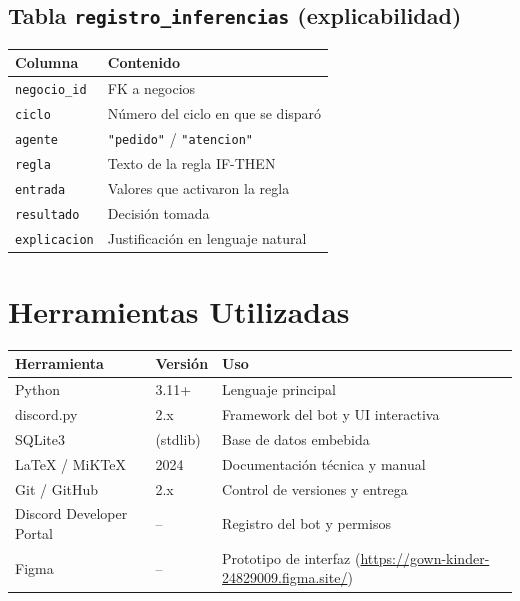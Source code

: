 \documentclass[12pt,spanish]{article}
\begin{document}
\subsection*{Tabla \texttt{registro\_inferencias} (explicabilidad)}

\begin{center}
\begin{tabular}{ll}
  \toprule
  Columna & Contenido \\
  \midrule
  \texttt{negocio\_id} & FK a negocios \\
  \texttt{ciclo} & Número del ciclo en que se disparó \\
  \texttt{agente} & \texttt{"pedido"} / \texttt{"atencion"} \\
  \texttt{regla} & Texto de la regla IF-THEN \\
  \texttt{entrada} & Valores que activaron la regla \\
  \texttt{resultado} & Decisión tomada \\
  \texttt{explicacion} & Justificación en lenguaje natural \\
  \bottomrule
\end{tabular}
\end{center}

\section{Herramientas Utilizadas}

\begin{center}
\begin{tabular}{lll}
  \toprule
  Herramienta & Versión & Uso \\
  \midrule
  Python & 3.11+ & Lenguaje principal \\
  discord.py & 2.x & Framework del bot y UI interactiva \\
  SQLite3 & (stdlib) & Base de datos embebida \\
  LaTeX / MiKTeX & 2024 & Documentación técnica y manual \\
  Git / GitHub & 2.x & Control de versiones y entrega \\
  Discord Developer Portal & -- & Registro del bot y permisos \\
  Figma & -- & Prototipo de interfaz (\url{https://gown-kinder-24829009.figma.site/}) \\
  \bottomrule
\end{tabular}
\end{center}
\end{document}
